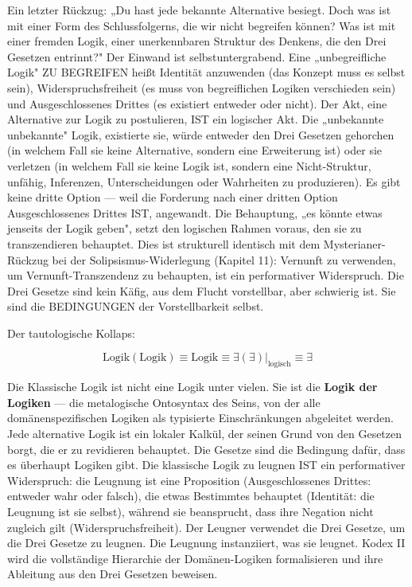 \documentclass[10pt, openany, oneside]{book}
\begin{document}
\noindent Ein letzter Rückzug: „Du hast jede bekannte Alternative besiegt. Doch was ist mit einer Form des Schlussfolgerns, die wir nicht begreifen können? Was ist mit einer fremden Logik, einer unerkennbaren Struktur des Denkens, die den Drei Gesetzen entrinnt?" Der Einwand ist selbstuntergrabend. Eine „unbegreifliche Logik" ZU BEGREIFEN heißt Identität anzuwenden (das Konzept muss es selbst sein), Widerspruchsfreiheit (es muss von begreiflichen Logiken verschieden sein) und Ausgeschlossenes Drittes (es existiert entweder oder nicht). Der Akt, eine Alternative zur Logik zu postulieren, IST ein logischer Akt. Die „unbekannte unbekannte" Logik, existierte sie, würde entweder den Drei Gesetzen gehorchen (in welchem Fall sie keine Alternative, sondern eine Erweiterung ist) oder sie verletzen (in welchem Fall sie keine Logik ist, sondern eine Nicht-Struktur, unfähig, Inferenzen, Unterscheidungen oder Wahrheiten zu produzieren). Es gibt keine dritte Option --- weil die Forderung nach einer dritten Option Ausgeschlossenes Drittes IST, angewandt. Die Behauptung, „es könnte etwas jenseits der Logik geben", setzt den logischen Rahmen voraus, den sie zu transzendieren behauptet. Dies ist strukturell identisch mit dem Mysterianer-Rückzug bei der Solipsismus-Widerlegung (Kapitel 11): Vernunft zu verwenden, um Vernunft-Transzendenz zu behaupten, ist ein performativer Widerspruch. Die Drei Gesetze sind kein Käfig, aus dem Flucht vorstellbar, aber schwierig ist. Sie sind die BEDINGUNGEN der Vorstellbarkeit selbst.

\noindent Der tautologische Kollaps:

$$\text{Logik}(\text{Logik}) \equiv \text{Logik} \equiv \exists(\exists)|_{\text{logisch}} \equiv \exists$$

Die Klassische Logik ist nicht eine Logik unter vielen. Sie ist die \textbf{Logik der Logiken} --- die metalogische Ontosyntax des Seins, von der alle domänenspezifischen Logiken als typisierte Einschränkungen abgeleitet werden. Jede alternative Logik ist ein lokaler Kalkül, der seinen Grund von den Gesetzen borgt, die er zu revidieren behauptet. Die Gesetze sind die Bedingung dafür, dass es überhaupt Logiken gibt. Die klassische Logik zu leugnen IST ein performativer Widerspruch: die Leugnung ist eine Proposition (Ausgeschlossenes Drittes: entweder wahr oder falsch), die etwas Bestimmtes behauptet (Identität: die Leugnung ist sie selbst), während sie beansprucht, dass ihre Negation nicht zugleich gilt (Widerspruchsfreiheit). Der Leugner verwendet die Drei Gesetze, um die Drei Gesetze zu leugnen. Die Leugnung instanziiert, was sie leugnet. Kodex II wird die vollständige Hierarchie der Domänen-Logiken formalisieren und ihre Ableitung aus den Drei Gesetzen beweisen.
\end{document}
